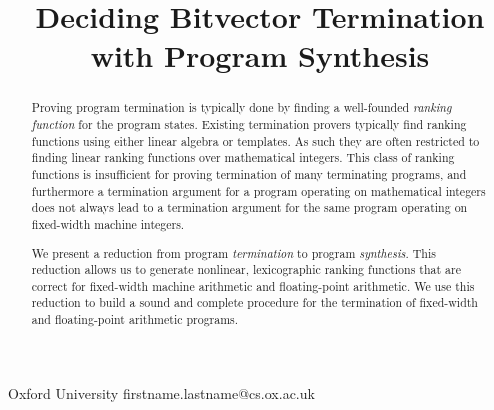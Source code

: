 \documentclass[preprint]{sigplanconf}
\theoremstyle{definition}
\begin{document}
\setlength{\pdfpageheight}{\paperheight}
\setlength{\pdfpagewidth}{\paperwidth}





\title{Deciding Bitvector Termination with Program Synthesis}

           {Oxford University}
           {firstname.lastname@cs.ox.ac.uk}

\maketitle

\begin{abstract}
%
Proving program termination is typically done by finding a well-founded
\emph{ranking function} for the program states.  Existing termination
provers typically find ranking functions using either linear algebra or
templates.  As such they are often restricted to finding linear ranking
functions over mathematical integers.  This class of ranking functions is
insufficient for proving termination of many terminating programs, and
furthermore a termination argument for a program operating on mathematical
integers does not always lead to a termination argument for the same program
operating on fixed-width machine integers.

We present a reduction from program \emph{termination} to program
\emph{synthesis}.  This reduction allows us to generate nonlinear,
lexicographic ranking functions that are correct for fixed-width machine
arithmetic and floating-point arithmetic.  We use this reduction to build a
sound and complete procedure for the termination of fixed-width and
floating-point arithmetic programs.
%
\end{abstract}

\end{document}

